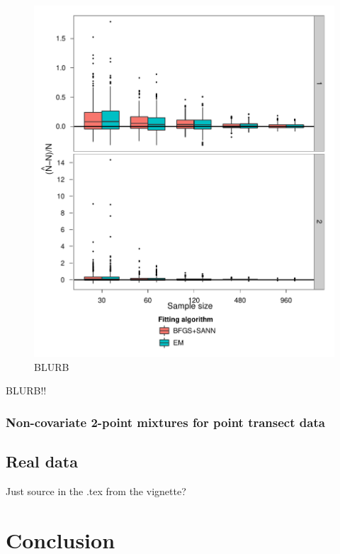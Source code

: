 \begin{figure}
\centering
\includegraphics[width=6in]{mix/figs/cov-N.pdf}
\caption{BLURB}
\label{mmds-cov-N-boxplots}
\end{figure}

BLURB!!





\subsubsection{Non-covariate 2-point mixtures for point transect data}



\subsection{Real data}

Just source in the .tex from the vignette?




\section{Conclusion}


